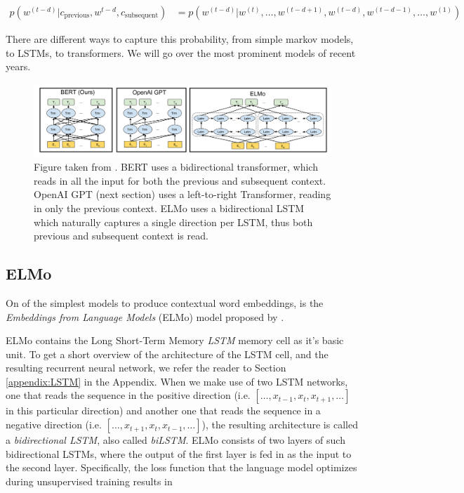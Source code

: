 \documentclass[a4paper,12pt,oneside,openright]{report}
\begin{document}
\begin{align}
p(w^{(t-d)} | c_\text{previous}, w^{t-d}, c_\text{subsequent}) &= p(w^{(t-d)} | w^{(t)}, \ldots, w^{(t-d + 1)}, w^{(t-d)}, w^{(t-d - 1)}, \ldots, w^{(1)})
\end{align}{\label{eq:transformer_probability}}

There are different ways to capture this probability, from simple markov models, to LSTMs, to transformers.
We will go over the most prominent models of recent years. \\

\begin{figure}[h]
	\center
  \includegraphics[width=\linewidth]{./assets/background/BERT_GPT_ELMo.png}
  \caption{Figure taken from \cite{devlin18}. BERT uses a bidirectional transformer, which reads in all the input for both the previous and subsequent context. OpenAI GPT (next section) uses a left-to-right Transformer, reading in only the previous context. ELMo uses a bidirectional LSTM which naturally captures a single direction per LSTM, thus both previous and subsequent context is read. }
  \label{fig:attention_is_all_you_need}
\end{figure}

\subsection{ELMo}

On of the simplest models to produce contextual word embeddings, is the \textit{Embeddings from Language Models} (ELMo) model proposed by \cite{peters17b}.

ELMo contains the Long Short-Term Memory \textit{LSTM} memory cell as it's basic unit.
To get a short overview of the architecture of the LSTM cell, and the resulting recurrent neural network, we refer the reader to Section \ref{appendix:LSTM} in the Appendix.
When we make use of two LSTM networks, one that reads the sequence in the positive direction (i.e. $[\ldots, x_{t-1}, x_t, x_{t+1}, \ldots]$ in this particular direction) and another one that reads the sequence in a negative direction (i.e. $[\ldots, x_{t+1}, x_t, x_{t-1}, \ldots]$), the resulting architecture is called a \textit{bidirectional LSTM}, also called \textit{biLSTM}.
ELMo consists of two layers of such bidirectional LSTMs, where the output of the first layer is fed in as the input to the second layer.
Specifically, the loss function that the language model optimizes during unsupervised training results in 
\end{document}
